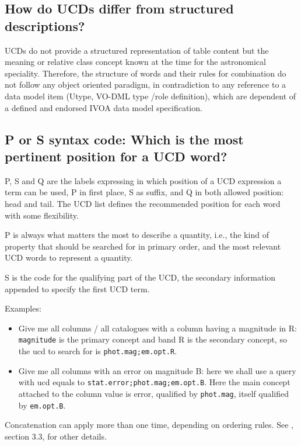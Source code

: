 \documentclass[11pt,a4paper]{ivoa}
\begin{document}
\subsection{How do UCDs differ from structured descriptions?}

UCDs do not provide a structured representation of table content but the meaning or relative class 
concept known at the time for the astronomical speciality. Therefore, the structure of words and 
their rules for combination do not follow any object oriented paradigm, in contradiction to any 
reference to a data model item (Utype, VO-DML type /role definition), which are dependent of a 
defined and endorsed IVOA data model specification.

\subsection{P or S syntax code: Which is the most pertinent position for a UCD word?}
P, S and Q are the labels expressing in which position of a UCD expression a term can be used, P 
in first place, S as suffix, and Q in both allowed position: head and tail. The UCD list defines 
the recommended position for each word with some flexibility.

P is always what matters the most to describe a quantity, i.e., the kind of property that should be 
searched for in primary order, and the most relevant UCD words to represent a quantity.

S is the code for the qualifying part of the UCD, the secondary information appended to specify 
the first UCD term.

Examples:
\begin{itemize}
\item Give me all columns / all catalogues with a column having a magnitude in R: {\tt magnitude} 
is the primary concept and band R is the secondary concept, so the ucd to search for is 
{\tt phot.mag;em.opt.R}.
\item Give me all columns with an error on magnitude B: here we shall use a query with ucd 
equals to {\tt stat.error;phot.mag;em.opt.B}. Here the main concept attached to the column 
value is error, qualified by {\tt phot.mag}, itself qualified by {\tt em.opt.B}.
\end{itemize}
Concatenation can apply more than one time, depending on ordering rules. See \citet{2005ivoa.spec.0819D}, section 3.3, 
for other details.
\end{document}

